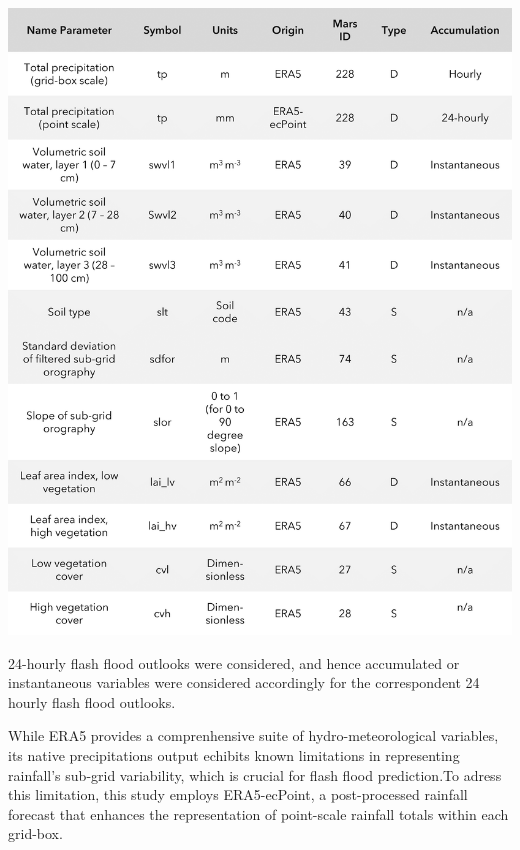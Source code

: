 \begin{table}[htbp]
\centering
{}
\includegraphics[width=1\textwidth]{parameters_used.png}
\label{table:parameters_used}
\end{table}

24-hourly flash flood outlooks were considered, and hence accumulated or instantaneous variables were considered accordingly for the correspondent 24 hourly flash flood outlooks. 

While ERA5 provides a comprenhensive suite of hydro-meteorological variables, its native precipitations output echibits known limitations in representing rainfall's sub-grid variability, which is crucial for flash flood prediction.To adress this limitation, this study employs ERA5-ecPoint, a post-processed rainfall forecast that enhances the representation of point-scale rainfall totals within each grid-box.  



